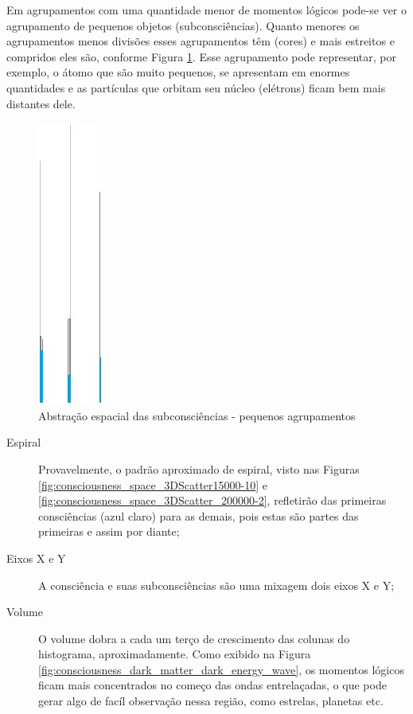 Em agrupamentos com uma quantidade menor de momentos lógicos pode-se ver o agrupamento de pequenos objetos (subconsciências). Quanto menores os agrupamentos menos divisões esses agrupamentos têm (cores) e mais estreitos e compridos eles são, conforme Figura \ref{fig:consciousness_space_subconsciousness_min}. Esse agrupamento pode representar, por exemplo, o átomo que são muito pequenos, se apresentam em enormes quantidades e as partículas que orbitam seu núcleo (elétrons) ficam bem mais distantes dele.
	\begin{figure}[H]
	\caption{Abstração espacial das subconsciências - pequenos agrupamentos}
	\label{fig:consciousness_space_subconsciousness_min}
	\centering
	\includegraphics[scale=.9]{sections/images/consciousness_space_subconsciousness_min.jpg}
	\end{figure}

	\begin{description}
	   \item[Espiral] Provavelmente, o padrão aproximado de espiral, visto nas Figuras \ref{fig:consciousness_space_3DScatter15000-10} e \ref{fig:consciousness_space_3DScatter_200000-2}, refletirão das primeiras consciências (azul claro) para as demais, pois estas são partes das primeiras e assim por diante;
	   \item[Eixos X e Y] A consciência e suas subconsciências são uma mixagem dois eixos X e Y;
	   \item[Volume] O volume dobra a cada um terço de crescimento das colunas do histograma, aproximadamente. Como exibido na Figura \ref{fig:consciousness_dark_matter_dark_energy_wave}, os momentos lógicos ficam mais concentrados no começo das ondas entrelaçadas, o que pode gerar algo de facíl observação nessa região, como estrelas, planetas etc. 
	\end{description}

